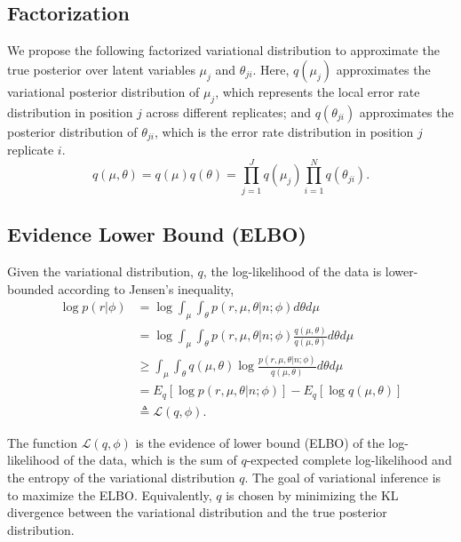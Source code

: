 \documentclass[11pt,reqno]{amsart}
\begin{document}
\subsection{Factorization}
We propose the following factorized variational distribution to approximate the true posterior over latent variables $\mu_j$ and $\theta_{ji}$.
Here, $q(\mu_j)$ approximates the variational posterior distribution of $\mu_j$, which represents the local error rate distribution in position $j$ across different replicates;
and $q(\theta_{ji})$ approximates the posterior distribution of $\theta_{ji}$, which is the error rate distribution in position $j$ replicate $i$.
\begin{equation}
  q(\mu, \theta) = q(\mu)q(\theta) = \prod_{j=1}^J q(\mu_{j}) \prod_{i=1}^N q(\theta_{ji}).
  \label{eq:vardist}
\end{equation}
\subsection{Evidence Lower Bound (ELBO)}
Given the variational distribution, $q$, the log-likelihood of the data is lower-bounded according to Jensen's inequality,
\begin{equation}
\begin{split}
\log p \left( r | \phi \right) &= \log \int_\mu \int_\theta p\left(r,\mu,\theta |n; \phi \right) d\theta d\mu \\
&= \log \int_\mu \int_\theta p\left(r,\mu,\theta |n; \phi \right)\frac{q\left(\mu,\theta \right) }{q\left(\mu,\theta \right) } d\theta d\mu \\
&\geq \int_\mu \int_\theta q\left(\mu,\theta \right) \log \frac{ p\left(r,\mu,\theta |n; \phi \right)}{q\left(\mu,\theta \right)} d\theta d\mu \\
&= E_q \left[ \log p\left(r,\mu,\theta |n; \phi \right)\right] - E_q \left[ \log q\left(\mu,\theta \right)\right] \\
&\triangleq \mathcal{L}(q, \phi).
\end{split}
\end{equation}

The function $\mathcal{L}(q, \phi)$ is the evidence of lower bound (ELBO) of the log-likelihood of the data, which is the sum of $q$-expected complete log-likelihood and the entropy of the variational distribution $q$.
The goal of variational inference is to maximize the ELBO.
Equivalently, $q$ is chosen by minimizing the KL divergence between the variational distribution and the true posterior distribution.
\end{document}

